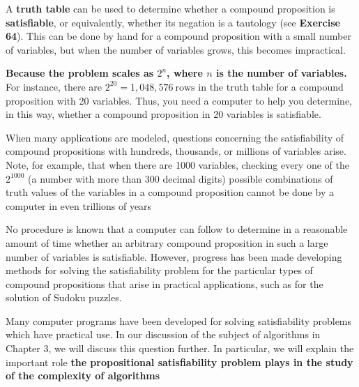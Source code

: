 \begin{tcolorbox}[colback=white, colframe=gray!60, title=Remark 1]
A \textbf{truth table} can be used to determine whether a compound proposition is \textbf{satisfiable}, or
equivalently, whether its negation is a tautology (see \textbf{Exercise 64}). \newline
This can be done by
hand for a compound proposition with a small number of variables, but when the number
of variables grows, this becomes impractical.
\end{tcolorbox}
\begin{tcolorbox}[colback=white, colframe=gray!60, title=Remark 2]
\textbf{Because the problem scales as $2^n$, where $n$ is the number of variables.} \newline
For instance, there are $2^{20} = 1,048,576 \ \text{rows}$
in the truth table for a compound proposition with 20 variables. Thus, you need a computer
to help you determine, in this way, whether a compound proposition in 20 variables is
satisfiable.
\end{tcolorbox}
\begin{tcolorbox}[colback=white, colframe=gray!60, title=Remark 3]
When many applications are modeled, questions concerning the satisfiability of compound
propositions with hundreds, thousands, or millions of variables arise. Note, for example, that
when there are 1000 variables, checking every one of the $2^{1000}$ (a number with more than 300
decimal digits) possible combinations of truth values of the variables in a compound proposition
cannot be done by a computer in even trillions of years
\end{tcolorbox}
\begin{tcolorbox}[colback=white, colframe=gray!60, title=Remark 4]
No procedure is known that a computer
can follow to determine in a reasonable amount of time whether an arbitrary compound
proposition in such a large number of variables is satisfiable. However, progress has been made
developing methods for solving the satisfiability problem for the particular types of compound
propositions that arise in practical applications, such as for the solution of Sudoku puzzles.
\end{tcolorbox}
\begin{tcolorbox}[colback=white, colframe=gray!60, title=Remark 5]
Many computer programs have been developed for solving satisfiability problems which have
practical use. \newline In our discussion of the subject of algorithms in Chapter 3, we will discuss this
question further. In particular, we will explain the important role \textbf{the propositional satisfiability
problem plays in the study of the complexity of algorithms}
\end{tcolorbox}




